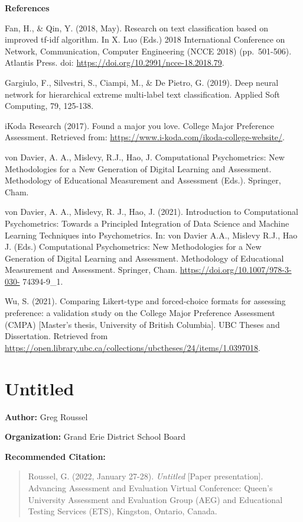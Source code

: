 \documentclass[
]{book}
\begin{document}
\textbf{References}

Fan, H., \& Qin, Y. (2018, May). Research on text classification based on improved tf-idf algorithm. In X. Luo (Eds.) 2018 International Conference on Network, Communication, Computer Engineering (NCCE 2018) (pp.~501-506). Atlantis Press. doi: \url{https://doi.org/10.2991/ncce-18.2018.79}.

Gargiulo, F., Silvestri, S., Ciampi, M., \& De Pietro, G. (2019). Deep neural network for hierarchical extreme multi-label text classification. Applied Soft Computing, 79, 125-138.

iKoda Research (2017). Found a major you love. College Major Preference Assessment. Retrieved from: \url{https://www.i-koda.com/ikoda-college-website/}.

von Davier, A. A., Mislevy, R.J., Hao, J. Computational Psychometrics: New Methodologies for a New Generation of Digital Learning and Assessment. Methodology of Educational Measurement and Assessment (Eds.). Springer, Cham.

von Davier, A. A., Mislevy, R. J., Hao, J. (2021). Introduction to Computational Psychometrics: Towards a Principled Integration of Data Science and Machine Learning Techniques into Psychometrics. In: von Davier A.A., Mislevy R.J., Hao J. (Eds.) Computational Psychometrics: New Methodologies for a New Generation of Digital Learning and Assessment. Methodology of Educational Measurement and Assessment. Springer, Cham. \url{https://doi.org/10.1007/978-3-030-} 74394-9\_1.

Wu, S. (2021). Comparing Likert-type and forced-choice formats for assessing preference: a validation study on the College Major Preference Assessment (CMPA) {[}Master's thesis, University of British Columbia{]}. UBC Theses and Dissertation. Retrieved from \url{https://open.library.ubc.ca/collections/ubctheses/24/items/1.0397018}.

\newpage

\hypertarget{untitled}{%
\section{Untitled}\label{untitled}}

\textbf{Author:} Greg Roussel

\textbf{Organization:} Grand Erie District School Board

\textbf{Recommended Citation:}

\begin{quote}
Roussel, G. (2022, January 27-28). \emph{Untitled} {[}Paper presentation{]}. Advancing Assessment and Evaluation Virtual Conference: Queen's University Assessment and Evaluation Group (AEG) and Educational Testing Services (ETS), Kingston, Ontario, Canada.
\end{quote}
\end{document}
